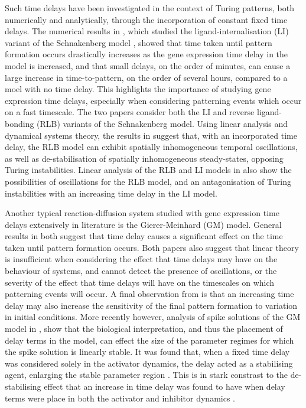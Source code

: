Such time delays have been investigated in the context of Turing patterns, both numerically and analytically, through the incorporation of constant fixed time delays. The numerical results in \cite{gaffmonk}, which studied the ligand-internalisation (LI) variant of the Schnakenberg model \cite{schnakenberg}, showed that time taken until pattern formation occurs drastically increases as the gene expression time delay in the model is increased, and that small delays, on the order of minutes, can cause a large increase in time-to-pattern, on the order of several hours, compared to a moel with no time delay. This highlights the importance of studying gene expression time delays, especially when considering patterning events which occur on a fast timescale. The two papers \cite{jiang, yigaffneyli} consider both the LI and reverse ligand-bonding (RLB) variants of the Schnakenberg model. Using linear analysis and dynamical systems theory, the results in \cite{jiang} suggest that, with an incorporated time delay, the RLB model can exhibit spatially inhomogeneous temporal oscillations, as well as de-stabilisation of spatially inhomogeneous steady-states, opposing Turing instabilities. Linear analysis of the RLB and LI models in \cite{yigaffneyli} also show the possibilities of oscillations for the RLB model, and an antagonisation of Turing instabilities with an increasing time delay in the LI model.

Another typical reaction-diffusion system studied with gene expression time delays extensively in literature is the Gierer-Meinhard (GM) model.
General results in both \cite{leegaffney,leegaffmonk} suggest that time delay causes a significant effect on the time taken until pattern formation occurs. Both papers also suggest that linear theory is insufficient when considering the effect that time delays may have on the behaviour of systems, and cannot detect the presence of oscillations, or the severity of the effect that time delays will have on the timescales on which patterning events will occur. A final observation from \cite{gaffmonk,leegaffmonk} is that an increasing time delay may also increase the sensitivity of the final pattern formation to variation in initial conditions. More recently however, analysis of spike solutions of the GM model in \cite{fadai1,fadai2}, show that the biological interpretation, and thus the placement of delay terms in the model, can effect the size of the parameter regimes for which the spike solution is linearly stable. It was found that, when a fixed time delay was considered solely in the activator dynamics, the delay acted as a stabilising agent, enlarging the stable parameter region \cite{fadai2}. This is in stark constrast to the de-stabilising effect that an increase in time delay was found to have when delay terms were place in both the activator and inhibitor dynamics \cite{fadai1}.

